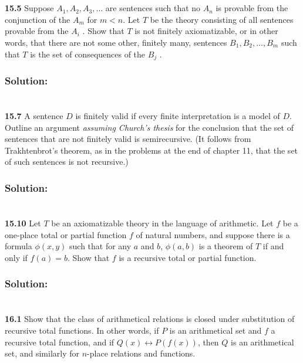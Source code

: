 \documentclass{ctexart}
\begin{document}
\section*{}
\textbf{15.5} Suppose $A_1, A_2, A_3, \dots$ are sentences such that no $A_n$ is provable from the
conjunction of the $A_m$ for $m < n$. Let $T$ be the theory consisting of all sentences
provable from the $A_i$ . Show that $T$ is not finitely axiomatizable, or in other
words, that there are not some other, finitely many, sentences $B_1 , B_2 , \dots , B_m$
such that $T$ is the set of consequences of the $B_j$ .

\subsubsection*{Solution:}

\section*{}
\textbf{15.7} A sentence $D$ is finitely valid if every finite interpretation is a model of $D$.
Outline an argument \textit{assuming Church’s thesis} for the conclusion that the
set of sentences that are not finitely valid is semirecursive. (It follows from
Trakhtenbrot’s theorem, as in the problems at the end of chapter 11, that the
set of such sentences is not recursive.)

\subsubsection*{Solution:}

\section*{}
\textbf{15.10} Let $T$ be an axiomatizable theory in the language of arithmetic. Let $f$ be a
one-place total or partial function $f$ of natural numbers, and suppose there is
a formula $\phi(x, y)$ such that for any $a$ and $b$, $\phi(a, b)$ is a theorem of $T$ if and
only if $f (a) = b$. Show that $f$ is a recursive total or partial function.

\subsubsection*{Solution:}

\section*{}
\textbf{16.1} Show that the class of arithmetical relations is closed under substitution of
recursive total functions. In other words, if $P$ is an arithmetical set and $f$ a
recursive total function, and if $Q(x) \leftrightarrow P( f (x))$, then $Q$ is an arithmetical set,
and similarly for $n$-place relations and functions.
\end{document}
